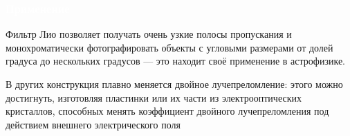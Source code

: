 \documentclass[aspectratio=169]{beamer}
\begin{document}
\begin{frame}
\frametitle{\textcolor{white}{Применение }}


Фильтр Лио позволяет получать очень узкие полосы пропускания и монохроматически фотографировать объекты с угловыми размерами от долей градуса до нескольких градусов — это находит своё применение в астрофизике.

В других конструкция плавно меняется двойное лучепреломление: этого можно достигнуть, изготовляя пластинки или их части из электрооптических кристаллов, способных менять коэффициент двойного лучепреломления под действием внешнего электрического поля
\end{frame}
\end{document}

